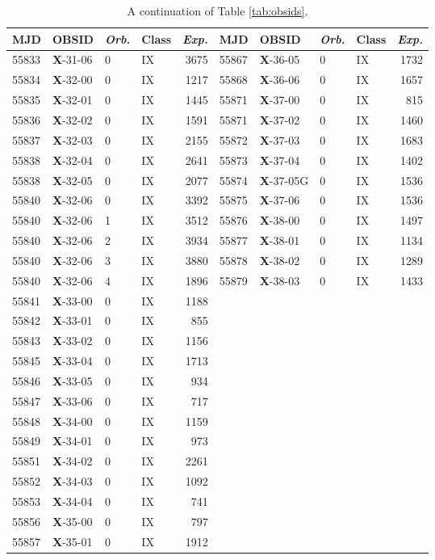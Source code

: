 \begin{table*}
\caption[]{A continuation of Table \ref{tab:obsids}.}
\label{tab:obsids4}
\begin{tabular}{llllrllllr}
\hline
\hline
MJD&OBSID&\textit{Orb.}&Class&\textit{Exp.}&MJD&OBSID&\textit{Orb.}&Class&\textit{Exp.}\\
\hline
55833&\textbf{X}-31-06&0&IX&3675&55867&\textbf{X}-36-05&0&IX&1732\\
55834&\textbf{X}-32-00&0&IX&1217&55868&\textbf{X}-36-06&0&IX&1657\\
55835&\textbf{X}-32-01&0&IX&1445&55871&\textbf{X}-37-00&0&IX&815\\
55836&\textbf{X}-32-02&0&IX&1591&55871&\textbf{X}-37-02&0&IX&1460\\
55837&\textbf{X}-32-03&0&IX&2155&55872&\textbf{X}-37-03&0&IX&1683\\
55838&\textbf{X}-32-04&0&IX&2641&55873&\textbf{X}-37-04&0&IX&1402\\
55838&\textbf{X}-32-05&0&IX&2077&55874&\textbf{X}-37-05G&0&IX&1536\\
55840&\textbf{X}-32-06&0&IX&3392&55875&\textbf{X}-37-06&0&IX&1536\\
55840&\textbf{X}-32-06&1&IX&3512&55876&\textbf{X}-38-00&0&IX&1497\\
55840&\textbf{X}-32-06&2&IX&3934&55877&\textbf{X}-38-01&0&IX&1134\\
55840&\textbf{X}-32-06&3&IX&3880&55878&\textbf{X}-38-02&0&IX&1289\\
55840&\textbf{X}-32-06&4&IX&1896&55879&\textbf{X}-38-03&0&IX&1433\\
55841&\textbf{X}-33-00&0&IX&1188&&&&&\\
55842&\textbf{X}-33-01&0&IX&855&&&&&\\
55843&\textbf{X}-33-02&0&IX&1156&&&&&\\
55845&\textbf{X}-33-04&0&IX&1713&&&&&\\
55846&\textbf{X}-33-05&0&IX&934&&&&&\\
55847&\textbf{X}-33-06&0&IX&717&&&&&\\
55848&\textbf{X}-34-00&0&IX&1159&&&&&\\
55849&\textbf{X}-34-01&0&IX&973&&&&&\\
55851&\textbf{X}-34-02&0&IX&2261&&&&&\\
55852&\textbf{X}-34-03&0&IX&1092&&&&&\\
55853&\textbf{X}-34-04&0&IX&741&&&&&\\
55856&\textbf{X}-35-00&0&IX&797&&&&&\\
55857&\textbf{X}-35-01&0&IX&1912&&&&&\\

\end{tabular}
\end{table*}
